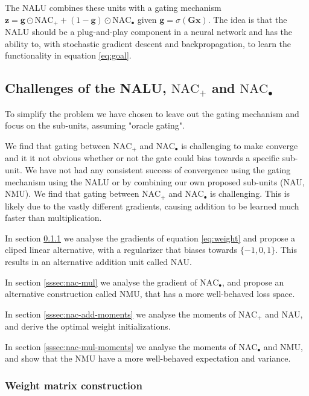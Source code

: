 The NALU combines these units with a gating mechanism $\mathbf{z} = \mathbf{g} \odot \text{NAC}_{+} + (1 - \mathbf{g}) \odot \text{NAC}_{\bullet}$ given $\mathbf{g} = \sigma(\mathbf{G} \mathbf{x})$. The idea is that the NALU should be a plug-and-play component in a neural network and has the ability to, with stochastic gradient descent and backpropagation, to learn the functionality in equation \ref{eq:goal}.

\subsection{Challenges of the NALU, $\text{NAC}_{+}$ and $\text{NAC}_{\bullet}$}
To simplify the problem we have chosen to leave out the gating mechanism and focus on the sub-units, assuming "oracle gating". 

We find that gating between $\text{NAC}_{+}$ and $\text{NAC}_{\bullet}$ is challenging to make converge and it it not obvious whether or not the gate could bias towards a specific sub-unit. We have not had any consistent success of convergence using the gating mechanism using the NALU or by combining our own proposed sub-units (NAU, NMU). We find that gating between $\text{NAC}_{+}$ and $\text{NAC}_{\bullet}$ is challenging. This is likely due to the vastly different gradients, causing addition to be learned much faster than multiplication.

In section \ref{sssec:weight} we analyse the gradients of equation \ref{eq:weight} and propose a cliped linear alternative, with a regularizer that biases towards $\{-1, 0, 1\}$. This results in an alternative addition unit called NAU.

In section \ref{sssec:nac-mul} we analyse the gradient of $\text{NAC}_{\bullet}$, and propose an alternative construction called NMU, that has a more well-behaved loss space.

In section \ref{sssec:nac-add-moments} we analyse the moments of $\text{NAC}_{+}$ and NAU, and derive the optimal weight initializations.

In section \ref{sssec:nac-mul-moments} we analyse the moments of $\text{NAC}_{\bullet}$ and NMU, and show that the NMU have a more well-behaved expectation and variance. 

\subsubsection{Weight matrix construction}\label{sssec:weight}

